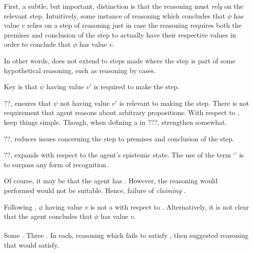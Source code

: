 \begin{note}[Relying]
  First, a subtle, but important, distinction is that the reasoning must \emph{rely} on the relevant step.
  Intuitively, some instance of reasoning which concludes that \(\phi\) has value \(v\) relies on a step of reasoning just in case the reasoning requires both the premises and conclusion of the step to actually have their respective values in order to conclude that \(\phi\) has value \(v\).

  In other words, \ideaCS{} does not extend to steps made where the step is part of some hypothetical reasoning, such as reasoning by cases.
\end{note}

\begin{note}
  Key is that \(\psi\) having value \(v'\) is required to make the step.

  ??, ensures that \(\psi\) not having value \(v'\) is relevant to making the step.
  There is not requirement that agent reasons about arbitrary \epVAd{} propositions.
  With respect to \ideaCS{}, keep things simple.
  Though, when defining a \requ{} in ???, strengthen somewhat.

  ??, reduces issues concerning the step to premises and conclusion of the step.

  ??, expands with respect to the agent's epistemic state.
  The use of the term `\committed{}' is to surpass any form of recognition.
\end{note}

\begin{note}
  Of course, it may be that the agent has \support{}.
  However, the reasoning would performed would not be suitable.
  Hence, failure of \emph{claiming} \support{}.

  Following \ideaS{}, \(\phi\) having value \(v\) is not a \sink{} with respect to .
  Alternatively, it is not clear that the agent concludes that \(\phi\) has value \(v\).
\end{note}

\paragraph{}

\begin{note}
  Some .
  Three .
  In each, reasoning which fails to satisfy \ideaCS{}, then suggested reasoning that would satisfy.
\end{note}

